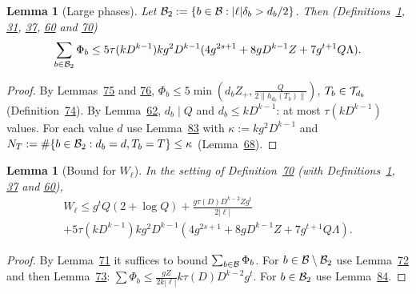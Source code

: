 \documentclass[11pt]{article}
\newcounter{hffc}
\theoremstyle{definition}\newtheorem{hffdef}[hffc]{Definition}
\theoremstyle{plain}\newtheorem{hfflem}[hffc]{Lemma}\newtheorem{hffthm}[hffc]{Theorem}
\theoremstyle{remark}\newtheorem{hffrem}[hffc]{Remark}
\newcommand{\hffcost}{}
\newcommand{\setcost}[1]{\renewcommand{\hffcost}{#1}}
\begin{document}
\begin{hfflem}[Large phases]\label{L:large}
Let $\mathcal{B}_2:=\{b\in\mathcal{B}:|\ell|\delta_b>d_b/2\}$. Then (Definitions~\hyperref[D:conv]{1}, \hyperref[D:node]{31}, \hyperref[D:phase]{37}, \hyperref[D:gpart]{60} and \hyperref[D:count]{70}) \[\sum_{b\in\mathcal{B}_2}\Phi_b\le5\tau(kD^{k-1})kg^2D^{k-1}(4g^{2s+1}+8gD^{k-1}Z+7g^{t+1}Q\Lambda).\]
\par\nopagebreak{}
\end{hfflem}
\begin{proof}\setcost{length 183/300}By Lemmas~\hyperref[L:pert]{75} and \hyperref[L:repl]{76}, $\Phi_b\le5\min(d_bZ_+,\frac Q{2\|h_{d_b}(T_b)\|})$, $T_b\in\mathcal{T}_{d_b}$ (Definition~\hyperref[D:curve]{74}). By Lemma~\hyperref[L:gcd]{62}, $d_b\mid Q$ and $d_b\le kD^{k-1}$: at most $\tau(kD^{k-1})$ values. For each value $d$ use Lemma~\hyperref[L:countT2]{83} with $\kappa:=kg^2D^{k-1}$ and $N_T:=\#\{b\in\mathcal{B}_2:d_b=d,T_b=T\}\le\kappa$ (Lemma~\hyperref[L:fibre]{68}).
\end{proof}

\begin{hfflem}[Bound for $W_\ell$]\label{L:W}
In the setting of Definition~\hyperref[D:count]{70} (with Definitions~\hyperref[D:conv]{1}, \hyperref[D:phase]{37} and \hyperref[D:gpart]{60}), \[\begin{gathered}W_\ell\le g^tQ(2+\log Q)+\frac{g\tau(D)D^{k-2}Zg^t}{2|\ell|}\\ +5\tau(kD^{k-1})kg^2D^{k-1}(4g^{2s+1}+8gD^{k-1}Z+7g^{t+1}Q\Lambda).\end{gathered}\]
\par\nopagebreak{}
\end{hfflem}
\begin{proof}\setcost{length 106/300}By Lemma~\hyperref[L:wphi]{71} it suffices to bound $\sum_{b\in\mathcal{B}}\Phi_b$. For $b\in\mathcal{B}\setminus\mathcal{B}_2$ use Lemma~\hyperref[L:small]{72} and then Lemma~\hyperref[L:sumd]{73}: $\sum\Phi_b\le\frac{gZ}{2k|\ell|}k\tau(D)D^{k-2}g^t$. For $b\in\mathcal{B}_2$ use Lemma~\hyperref[L:large]{84}.
\end{proof}
\end{document}
